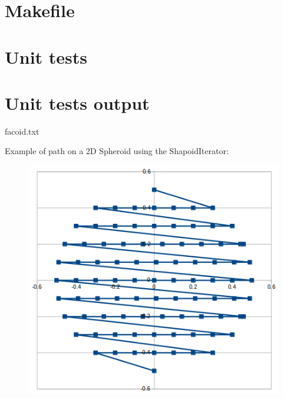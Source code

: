\section{Makefile}

\begin{scriptsize}
\begin{ttfamily}

\end{ttfamily}
\end{scriptsize}

\section{Unit tests}

\begin{scriptsize}
\begin{ttfamily}

\end{ttfamily}
\end{scriptsize}

\section{Unit tests output}

\begin{scriptsize}
\begin{ttfamily}

\end{ttfamily}
\end{scriptsize}

facoid.txt

\begin{scriptsize}
\begin{ttfamily}

\end{ttfamily}
\end{scriptsize}

Example of path on a 2D Spheroid using the ShapoidIterator:\\

\begin{center}
\begin{figure}[H]
\centering
\includegraphics[width=12cm]{./spheroid2dpath.png}
\end{figure}
\end{center}
